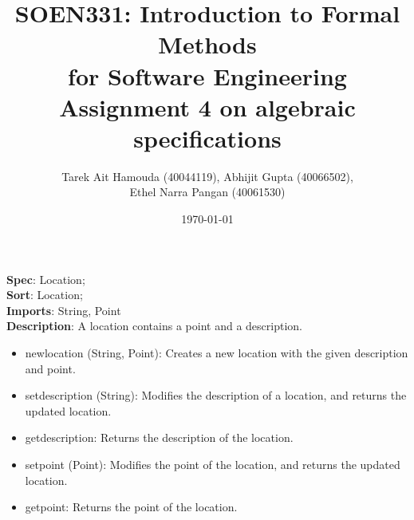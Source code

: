 \documentclass[12pt]{article}
\title{SOEN331: Introduction to Formal Methods\\for Software Engineering\\
Assignment 4 on algebraic specifications}
\author{Tarek Ait Hamouda (40044119), Abhijit Gupta (40066502), \\Ethel Narra Pangan (40061530)}
\date{\today}
\begin{document}
\begin{spacing}{1.5}

\maketitle

\noindent \textbf{Spec}: Location;\\
\noindent \textbf{Sort}: Location;\\
\noindent \textbf{Imports}: String, Point\\
\noindent \textbf{Description}: A location contains a point and a description.
\begin{itemize}
	\item newlocation (String, Point): Creates a new location with the given description and point.
	\item setdescription (String): Modifies the description of a location, and returns the updated location.
	\item getdescription: Returns the description of the location.
	\item setpoint (Point): Modifies the point of the location, and returns the updated location.
	\item getpoint: Returns the point of the location.
\end{itemize}


\end{spacing}
\end{document}
